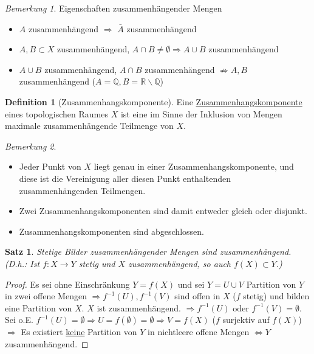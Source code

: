\documentclass[a4paper,11pt,notitlepage]{report}
\newtheorem{theorem}{Satz}[chapter]
\theoremstyle{remark}
\newtheorem{remark}{Bemerkung}[chapter]
\theoremstyle{definition}
\newtheorem{definition}{Definition}[chapter]
\newcommand{\R}{{\ensuremath{\mathbb{R}}}}
\newcommand{\Q}{{\ensuremath{\mathbb{Q}}}}
\begin{document}
\begin{remark}{Eigenschaften zusammenhängender Mengen}
	\begin{itemize}
		\item $A$ zusammenhängend $\Rightarrow$ $\bar{A}$ zusammenhängend
		\item $A,B \subset X$ zusammenhängend, $A \cap B \neq \emptyset \Rightarrow A \cup B$ zusammenhängend
		\item $A \cup B$ zusammenhängend, $A \cap B$ zusammenhängend $\not\Rightarrow A,B$ zusammenhängend ($A = \Q, B = \R \backslash \Q$)
	\end{itemize}
\end{remark}

\begin{definition}[Zusammenhangskomponente]
	Eine \underline{Zusammenhangskomponente} eines topologischen Raumes $X$ ist eine im Sinne der Inklusion von Mengen maximale zusammenhängende Teilmenge von $X$.
\end{definition}

\begin{remark}{}
	\begin{itemize}
		\item Jeder Punkt von $X$ liegt genau in einer Zusammenhangskomponente, und diese ist die Vereinigung aller diesen Punkt enthaltenden zusammenhängenden Teilmengen.
		\item Zwei Zusammenhangskomponenten sind damit entweder gleich oder disjunkt.
		\item Zusammenhangskomponenten sind abgeschlossen.
	\end{itemize}
\end{remark}

\begin{theorem}
	Stetige Bilder zusammenhängender Mengen sind zusammenhängend.
	\newline
	(D.h.: Ist $f \colon X \rightarrow Y$ stetig und $X$ zusammenhängend, so auch $f(X)\subset Y$.)
\end{theorem}

\begin{proof}
	Es sei ohne Einschränkung $Y=f(X)$ und sei $Y=U \cup V$ Partition von $Y$ in zwei offene Mengen $\Rightarrow f^{-1}(U), f^{-1}(V)$ sind offen in $X$ ($f$ stetig) und bilden eine Partition von $X$. $X$ ist zusammenhängend.
	$\Rightarrow f^{-1}(U) \text{ oder } f^{-1}(V) = \emptyset$.
	\newline
	Sei o.E. $f^{-1}(U) = \emptyset \Rightarrow U = f(\emptyset) = \emptyset \Rightarrow V = f(X)$ ($f$ surjektiv auf $f(X)$)
	\newline
	$\Rightarrow$ Es existiert \underline{keine} Partition von $Y$ in nichtleere offene Mengen $\Leftrightarrow Y$ zusammenhängend.
\end{proof}
\end{document}

